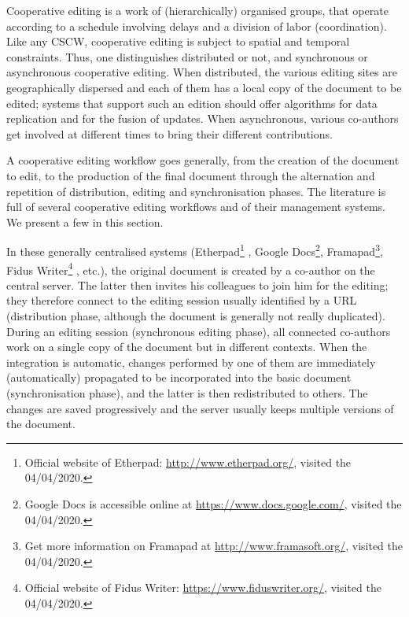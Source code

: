 \label{chap2:sec:cooperative-editing-concepts}
Cooperative editing is a work of (hierarchically) organised groups, that operate according to a schedule involving delays and a division of labor (coordination). 
Like any CSCW, cooperative editing is subject to spatial and temporal constraints. Thus, one distinguishes distributed or not, and synchronous or asynchronous cooperative editing. When distributed, the various editing sites are geographically dispersed and each of them has a local copy of the document to be edited; systems that support such an edition should offer algorithms for data replication \cite{Yasushi2005} and for the fusion of updates. When asynchronous, various co-authors get involved at different times to bring their different contributions.

A cooperative editing workflow goes generally, from the creation of the document to edit, to the production of the final document through the alternation and repetition of distribution, editing and synchronisation phases. The literature is full of several cooperative editing workflows and of their management systems. We present a few in this section.


\label{chap2:sec:real-time-cooperative-editing}
In these generally centralised systems (Etherpad\footnote{Official website of Etherpad: \url{http://www.etherpad.org/}, visited the 04/04/2020.} \cite{epad}, Google Docs\footnote{Google Docs is accessible online at \url{https://www.docs.google.com/}, visited the 04/04/2020.}, Framapad\footnote{Get more information on Framapad at \url{http://www.framasoft.org/}, visited the 04/04/2020.}, Fidus Writer\footnote{Official website of Fidus Writer: \url{https://www.fiduswriter.org/}, visited the 04/04/2020.} \cite{fiduswriter}, etc.), the original document is created by a co-author on the central server. The latter then invites his colleagues to join him for the editing; they therefore connect to the editing session usually identified by a URL (distribution phase, although the document is generally not really duplicated). During an editing session (synchronous editing phase), all connected co-authors work on a single copy of the document but in different contexts. When the integration is automatic, changes performed by one of them are immediately (automatically) propagated to be incorporated into the basic document (synchronisation phase), and the latter is then redistributed to others. The changes are saved progressively and the server usually keeps multiple versions of the document.

